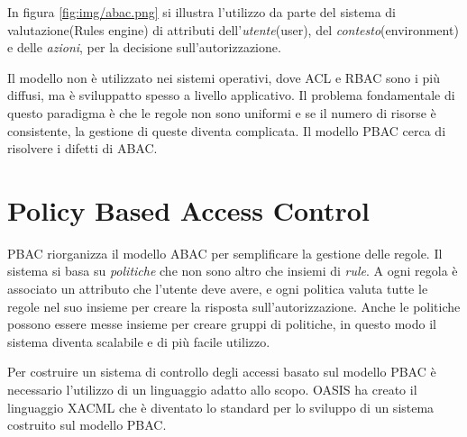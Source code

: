 In figura \ref{fig:img/abac.png} si illustra l'utilizzo da parte del sistema di valutazione(Rules engine) di
attributi dell'\emph{utente}(user), del \emph{contesto}(environment) e delle \emph{azioni}, per la decisione
sull'autorizzazione.

Il modello non è utilizzato nei sistemi operativi, dove \ac{ACL} e \ac{RBAC} sono i più diffusi, ma è sviluppatto
spesso a livello applicativo. Il problema fondamentale di questo paradigma è che le regole non sono uniformi e se il numero
di risorse è consistente, la gestione di queste diventa complicata. Il modello \acf{PBAC} cerca di
risolvere i difetti di \ac{ABAC}.
\section{Policy Based Access Control}
\label{sec:PBAC}
\ac{PBAC} riorganizza il modello \ac{ABAC} per semplificare la gestione delle regole.
Il sistema si basa su \emph{politiche} che non sono altro che insiemi di \emph{rule}. A ogni regola è associato un attributo
che l'utente deve avere, e ogni politica valuta tutte le regole nel suo insieme per creare la risposta sull'autorizzazione. Anche
le politiche possono essere messe insieme per creare gruppi di politiche, in questo modo il sistema diventa scalabile e di
più facile utilizzo.\par
Per costruire un sistema di controllo degli accessi basato sul modello \ac{PBAC} è necessario l'utilizzo di
un linguaggio adatto allo scopo. \ac{OASIS} ha creato il linguaggio \ac{XACML} che è diventato lo standard per lo sviluppo di un sistema costruito sul modello PBAC.
